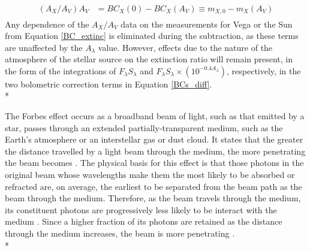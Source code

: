 \documentclass[12pt, a4paper]{report}
\begin{document}
\begin{align}
\begin{split}
\left(A_{X}/A_{V}\right)A_{V} &= BC_{X}(0) - BC_{X}(A_{V}) \equiv m_{X,0} - m_{X}(A_{V})
\label{BCs_diff}
\end{split}
\end{align}
Any dependence of the $A_{X}/A_{V}$ data on the measurements for Vega or the Sun from Equation \ref{BC_extinc} is eliminated during the subtraction, as these terms are unaffected by the $A_{\lambda}$ value. However, effects due to the nature of the atmosphere of the stellar source on the extinction ratio will remain present, in the form of the integrations of $F_{\lambda}S_{\lambda}$ and $F_{\lambda}S_{\lambda} \times \left( 10^{-0.4 A_{\lambda}} \right)$, respectively, in the two bolometric correction terms in Equation \ref{BCs_diff}. \\*

The Forbes effect occurs as a broadband beam of light, such as that emitted by a star, passes through an extended partially-transparent medium, such as the Earth's atmosphere or an interstellar gas or dust cloud. It states that the greater the distance travelled by a light beam through the medium, the more penetrating the beam becomes \citep{1842RSPT..132..225F}. The physical basis for this effect is that those photons in the original beam whose wavelengths make them the most likely to be absorbed or refracted are, on average, the earliest to be separated from the beam path as the beam through the medium. Therefore, as the beam travels through the medium, its constituent photons are progressively less likely to be interact with the medium \citep{1995A&AS..109..293G}. Since a higher fraction of its photons are retained as the distance through the medium increases, the beam is more penetrating \citep{OHVRIL1999305}.\\*
\end{document}
